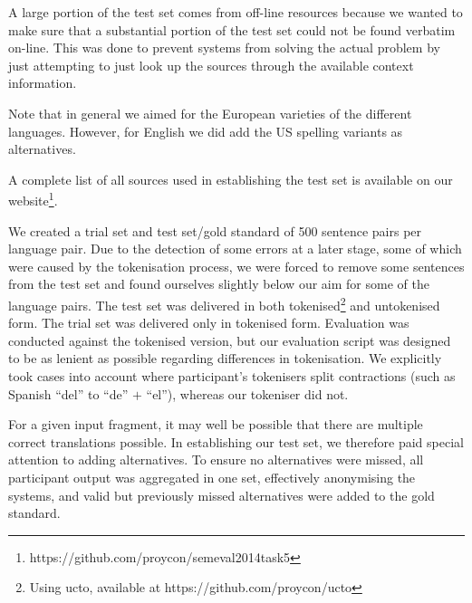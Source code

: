 A large portion of the test set comes from off-line resources because we wanted
to make sure that a substantial portion of the test set could not be found
verbatim on-line. This was done to prevent systems from solving the actual
problem by just attempting to just look up the sources through the available
context information. 

Note that in general we aimed for the European varieties of the different
languages. However, for English we did add the US spelling variants as
alternatives.

A complete list of all sources used in establishing the test set is available on our website\footnote{https://github.com/proycon/semeval2014task5}.


We created a trial set and test set/gold standard of 500 sentence pairs per
language pair. Due to the detection of some errors at a later stage, some of
which were caused by the tokenisation process, we were forced to remove some
sentences from the test set and found ourselves slightly below our aim for some
of the language pairs. The test set was delivered in both
tokenised\footnote{Using ucto, available at https://github.com/proycon/ucto}
and untokenised form. The trial set was delivered only in tokenised form.
Evaluation was conducted against the tokenised version, but our evaluation
script was designed to be as lenient as possible regarding differences in
tokenisation. We explicitly took cases into account where participant's
tokenisers split contractions (such as Spanish ``del'' to ``de'' $+$ ``el''),
whereas our tokeniser did not. 

For a given input fragment, it may well be possible that there are multiple
correct translations possible. In establishing our test set, we therefore paid
special attention to adding alternatives. To ensure no alternatives were
missed, all participant output was aggregated in one set, effectively
anonymising the systems, and valid but previously missed alternatives were
added to the gold standard.


